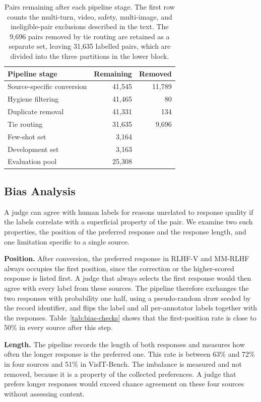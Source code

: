 \documentclass[11pt]{article}
\begin{document}
\begin{table}[t]
\centering
\small
\setlength{\tabcolsep}{4pt}
\begin{tabularx}{\linewidth}{Y r r}
\toprule
\textbf{Pipeline stage} & \textbf{Remaining} & \textbf{Removed} \\
\midrule
Source-specific conversion & 41,545 & 11,789 \\
Hygiene filtering & 41,465 & 80 \\
Duplicate removal & 41,331 & 134 \\
Tie routing & 31,635 & 9,696 \\
\midrule
Few-shot set & 3,164 & \\
Development set & 3,163 & \\
Evaluation pool & 25,308 & \\
\bottomrule
\end{tabularx}
\caption{Pairs remaining after each pipeline stage. The first row counts the multi-turn, video, safety, multi-image, and ineligible-pair exclusions described in the text. The 9,696 pairs removed by tie routing are retained as a separate set, leaving 31,635 labelled pairs, which are divided into the three partitions in the lower block.}
\label{tab:dataset-funnel}
\end{table}

\subsection{Bias Analysis}
A judge can agree with human labels for reasons unrelated to response quality if the labels correlate with a superficial property of the pair. We examine two such properties, the position of the preferred response and the response length, and one limitation specific to a single source.

\textbf{Position.} After conversion, the preferred response in RLHF-V and MM-RLHF always occupies the first position, since the correction or the higher-scored response is listed first. A judge that always selects the first response would then agree with every label from these sources. The pipeline therefore exchanges the two responses with probability one half, using a pseudo-random draw seeded by the record identifier, and flips the label and all per-annotator labels together with the responses. Table~\ref{tab:bias-checks} shows that the first-position rate is close to 50\% in every source after this step.

\textbf{Length.} The pipeline records the length of both responses and measures how often the longer response is the preferred one. This rate is between 63\% and 72\% in four sources and 51\% in VisIT-Bench. The imbalance is measured and not removed, because it is a property of the collected preferences. A judge that prefers longer responses would exceed chance agreement on these four sources without assessing content.
\end{document}
